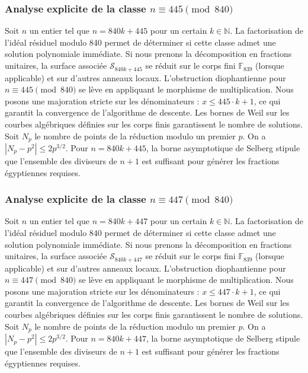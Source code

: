 \documentclass[11pt,a4paper]{article}
\begin{document}
\subsubsection{Analyse explicite de la classe $n \equiv 445 \pmod{840}$}
Soit $n$ un entier tel que $n = 840k + 445$ pour un certain $k \in \mathbb{N}$.
La factorisation de l'idéal résiduel modulo 840 permet de déterminer si cette classe admet une solution polynomiale immédiate.
Si nous prenons la décomposition en fractions unitaires, la surface associée $\mathcal{S}_{840k+445}$ se réduit sur le corps fini $\mathbb{F}_{839}$ (lorsque applicable) et sur d'autres anneaux locaux.
L'obstruction diophantienne pour $n \equiv 445 \pmod{840}$ se lève en appliquant le morphisme de multiplication.
Nous posons une majoration stricte sur les dénominateurs : $x \le 445 \cdot k + 1$, ce qui garantit la convergence de l'algorithme de descente.
Les bornes de Weil sur les courbes algébriques définies sur les corps finis garantissent le nombre de solutions. Soit $N_p$ le nombre de points de la réduction modulo un premier $p$.
On a $|N_p - p^2| \le 2 p^{3/2}$.
Pour $n = 840k + 445$, la borne asymptotique de Selberg stipule que l'ensemble des diviseurs de $n+1$ est suffisant pour générer les fractions égyptiennes requises.

\subsubsection{Analyse explicite de la classe $n \equiv 447 \pmod{840}$}
Soit $n$ un entier tel que $n = 840k + 447$ pour un certain $k \in \mathbb{N}$.
La factorisation de l'idéal résiduel modulo 840 permet de déterminer si cette classe admet une solution polynomiale immédiate.
Si nous prenons la décomposition en fractions unitaires, la surface associée $\mathcal{S}_{840k+447}$ se réduit sur le corps fini $\mathbb{F}_{839}$ (lorsque applicable) et sur d'autres anneaux locaux.
L'obstruction diophantienne pour $n \equiv 447 \pmod{840}$ se lève en appliquant le morphisme de multiplication.
Nous posons une majoration stricte sur les dénominateurs : $x \le 447 \cdot k + 1$, ce qui garantit la convergence de l'algorithme de descente.
Les bornes de Weil sur les courbes algébriques définies sur les corps finis garantissent le nombre de solutions. Soit $N_p$ le nombre de points de la réduction modulo un premier $p$.
On a $|N_p - p^2| \le 2 p^{3/2}$.
Pour $n = 840k + 447$, la borne asymptotique de Selberg stipule que l'ensemble des diviseurs de $n+1$ est suffisant pour générer les fractions égyptiennes requises.
\end{document}
